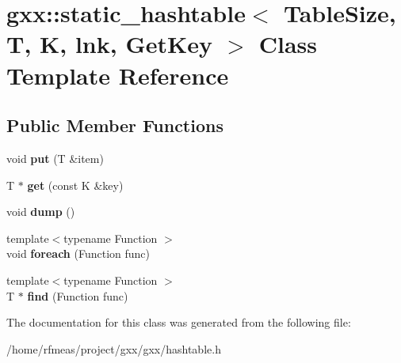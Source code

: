 \hypertarget{classgxx_1_1static__hashtable}{}\section{gxx\+:\+:static\+\_\+hashtable$<$ Table\+Size, T, K, lnk, Get\+Key $>$ Class Template Reference}
\label{classgxx_1_1static__hashtable}
\subsection*{Public Member Functions}
\begin{DoxyCompactItemize}
\item 
void {\bfseries put} (T \&item)\hypertarget{classgxx_1_1static__hashtable_a16e11ee447f76e269bb7fde8a5cce611}{}\label{classgxx_1_1static__hashtable_a16e11ee447f76e269bb7fde8a5cce611}

\item 
T $\ast$ {\bfseries get} (const K \&key)\hypertarget{classgxx_1_1static__hashtable_adc4dc697e3595d020d1f2e9d270cc625}{}\label{classgxx_1_1static__hashtable_adc4dc697e3595d020d1f2e9d270cc625}

\item 
void {\bfseries dump} ()\hypertarget{classgxx_1_1static__hashtable_ab000e314ddb69d4997ee504d5e8f2679}{}\label{classgxx_1_1static__hashtable_ab000e314ddb69d4997ee504d5e8f2679}

\item 
{\footnotesize template$<$typename Function $>$ }\\void {\bfseries foreach} (Function func)\hypertarget{classgxx_1_1static__hashtable_a47acc94336f0eb4d64706c0994038afa}{}\label{classgxx_1_1static__hashtable_a47acc94336f0eb4d64706c0994038afa}

\item 
{\footnotesize template$<$typename Function $>$ }\\T $\ast$ {\bfseries find} (Function func)\hypertarget{classgxx_1_1static__hashtable_a96f351b156c63944edb735f4a600e759}{}\label{classgxx_1_1static__hashtable_a96f351b156c63944edb735f4a600e759}

\end{DoxyCompactItemize}


The documentation for this class was generated from the following file\+:\begin{DoxyCompactItemize}
\item 
/home/rfmeas/project/gxx/gxx/hashtable.\+h\end{DoxyCompactItemize}

